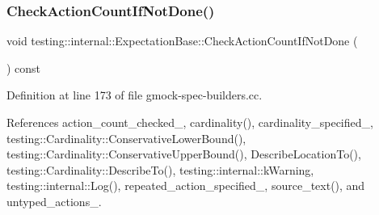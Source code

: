 \subsubsection{\texorpdfstring{Check\+Action\+Count\+If\+Not\+Done()}{CheckActionCountIfNotDone()}}
{\footnotesize\ttfamily void testing\+::internal\+::\+Expectation\+Base\+::\+Check\+Action\+Count\+If\+Not\+Done (\begin{DoxyParamCaption}{ }\end{DoxyParamCaption}) const\hspace{0.3cm}{\ttfamily [protected]}}



Definition at line 173 of file gmock-\/spec-\/builders.\+cc.



References action\+\_\+count\+\_\+checked\+\_\+, cardinality(), cardinality\+\_\+specified\+\_\+, testing\+::\+Cardinality\+::\+Conservative\+Lower\+Bound(), testing\+::\+Cardinality\+::\+Conservative\+Upper\+Bound(), Describe\+Location\+To(), testing\+::\+Cardinality\+::\+Describe\+To(), testing\+::internal\+::k\+Warning, testing\+::internal\+::\+Log(), repeated\+\_\+action\+\_\+specified\+\_\+, source\+\_\+text(), and untyped\+\_\+actions\+\_\+.


